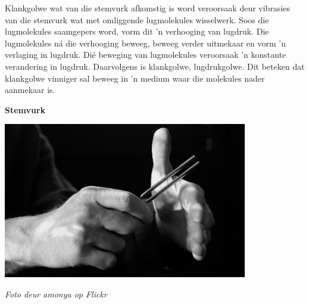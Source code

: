 \begin{minipage}{.5\textwidth}
Klankgolwe wat van die stemvurk afkomstig is word veroorsaak deur vibrasies van die stemvurk wat met omliggende lugmolekules wisselwerk. Soos die lugmolekules saamgepers word, vorm dit 'n verhooging van lugdruk. Die lugmolekules n\'a die verhooging beweeg, beweeg verder uitmekaar en vorm 'n verlaging in lugdruk. Di\'{e} beweging van lugmolekules veroorsaak 'n konstante verandering in lugdruk. Daarvolgens is klankgolwe, lugdrukgolwe. Dit beteken dat klankgolwe vinniger sal beweeg in 'n medium waar die molekules nader aanmekaar is.

\end{minipage}
\begin{minipage}{.5\textwidth}\begin{center}
\textbf{Stemvurk}\par
    \includegraphics[width=0.8\textwidth]{../Grade10/photos/TuningFork2_Flickr_amonya.jpg}\par
\textit{Foto deur amonya op Flickr}
\end{center}
\end{minipage}

